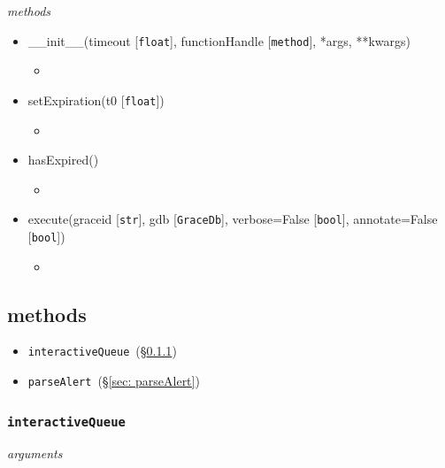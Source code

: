 \documentclass{article}
\newcommand{\interactiveQueue}{\texttt{interactiveQueue}~}
\newcommand{\parseAlert}{\texttt{parseAlert}~}
\begin{document}
\noindent
\textit{methods}

\begin{itemize}
    \item{\_\_init\_\_(timeout [\texttt{float}], functionHandle [\texttt{method}], *args, **kwargs)
        \begin{itemize}
            \item{}
        \end{itemize}
         }
    \item{setExpiration(t0 [\texttt{float}])
        \begin{itemize}
            \item{}
        \end{itemize}
         }
    \item{hasExpired()
        \begin{itemize}
            \item{}
        \end{itemize}
         }
    \item{execute(graceid [\texttt{str}], gdb [\texttt{GraceDb}], verbose=False [\texttt{bool}], annotate=False [\texttt{bool}])
        \begin{itemize}
            \item{}
        \end{itemize}
         }
\end{itemize}


\subsection{methods}
\label{sec: methods}

\begin{itemize}
    \item{\interactiveQueue (\S\ref{sec: interactiveQueue})}
    \item{\parseAlert (\S\ref{sec: parseAlert})}
\end{itemize}


\subsubsection{\interactiveQueue}
\label{sec: interactiveQueue}

\vspace{0.5cm}
\noindent
\textit{arguments}
\end{document}
